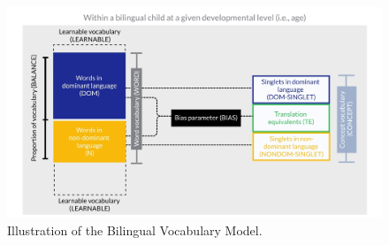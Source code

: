 \documentclass[
  english,
  ,man,floatsintext]{apa6}
\begin{document}
\begin{figure}

{\centering \includegraphics[width=1\linewidth]{./Figure1_illustration} 

}

\caption{Illustration of the Bilingual Vocabulary Model.}\label{fig:fig1}
\end{figure}
\end{document}
